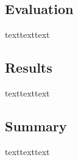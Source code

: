 \documentclass[12pt]{article}
\begin{document}
\subsection{Evaluation}
texttexttext

\subsection{Results}
texttexttext

\subsection{Summary}
texttexttext




\newpage
\medskip

\end{document}
